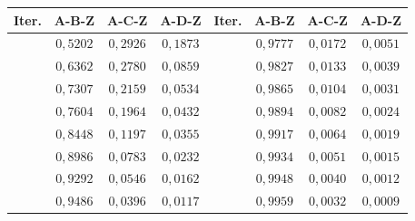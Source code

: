 \begin{table}[H]
\centering
\small
\setlength{\tabcolsep}{6pt}
\renewcommand{\arraystretch}{1.15}
\begin{tabular}{|c|c|c|c|c|c|c|c|}
\hline
\rowcolor{encabezado}\textbf{Iter.} & \textbf{A-B-Z} & \textbf{A-C-Z} & \textbf{A-D-Z} & \textbf{Iter.} & \textbf{A-B-Z} & \textbf{A-C-Z} & \textbf{A-D-Z} \\
\hline
\cellcolor{destacado}{\bfseries\boldmath $1$} & \cellcolor{destacado}$0{,}5202$ & \cellcolor{destacado}$0{,}2926$ & \cellcolor{destacado}$0{,}1873$ & \cellcolor{iteracion}{\bfseries\boldmath $11$} & $0{,}9777$ & $0{,}0172$ & $0{,}0051$ \\
\hline
\cellcolor{iteracion}{\bfseries\boldmath $2$} & \cellcolor{cebra}$0{,}6362$ & \cellcolor{cebra}$0{,}2780$ & \cellcolor{cebra}$0{,}0859$ & \cellcolor{iteracion}{\bfseries\boldmath $12$} & \cellcolor{cebra}$0{,}9827$ & \cellcolor{cebra}$0{,}0133$ & \cellcolor{cebra}$0{,}0039$ \\
\hline
\cellcolor{iteracion}{\bfseries\boldmath $3$} & $0{,}7307$ & $0{,}2159$ & $0{,}0534$ & \cellcolor{iteracion}{\bfseries\boldmath $13$} & $0{,}9865$ & $0{,}0104$ & $0{,}0031$ \\
\hline
\cellcolor{iteracion}{\bfseries\boldmath $4$} & \cellcolor{cebra}$0{,}7604$ & \cellcolor{cebra}$0{,}1964$ & \cellcolor{cebra}$0{,}0432$ & \cellcolor{iteracion}{\bfseries\boldmath $14$} & \cellcolor{cebra}$0{,}9894$ & \cellcolor{cebra}$0{,}0082$ & \cellcolor{cebra}$0{,}0024$ \\
\hline
\cellcolor{iteracion}{\bfseries\boldmath $5$} & $0{,}8448$ & $0{,}1197$ & $0{,}0355$ & \cellcolor{iteracion}{\bfseries\boldmath $15$} & $0{,}9917$ & $0{,}0064$ & $0{,}0019$ \\
\hline
\cellcolor{iteracion}{\bfseries\boldmath $6$} & \cellcolor{cebra}$0{,}8986$ & \cellcolor{cebra}$0{,}0783$ & \cellcolor{cebra}$0{,}0232$ & \cellcolor{iteracion}{\bfseries\boldmath $16$} & \cellcolor{cebra}$0{,}9934$ & \cellcolor{cebra}$0{,}0051$ & \cellcolor{cebra}$0{,}0015$ \\
\hline
\cellcolor{iteracion}{\bfseries\boldmath $7$} & $0{,}9292$ & $0{,}0546$ & $0{,}0162$ & \cellcolor{iteracion}{\bfseries\boldmath $17$} & $0{,}9948$ & $0{,}0040$ & $0{,}0012$ \\
\hline
\cellcolor{iteracion}{\bfseries\boldmath $8$} & \cellcolor{cebra}$0{,}9486$ & \cellcolor{cebra}$0{,}0396$ & \cellcolor{cebra}$0{,}0117$ & \cellcolor{iteracion}{\bfseries\boldmath $18$} & \cellcolor{cebra}$0{,}9959$ & \cellcolor{cebra}$0{,}0032$ & \cellcolor{cebra}$0{,}0009$ \\

\end{tabular}
\end{table}
